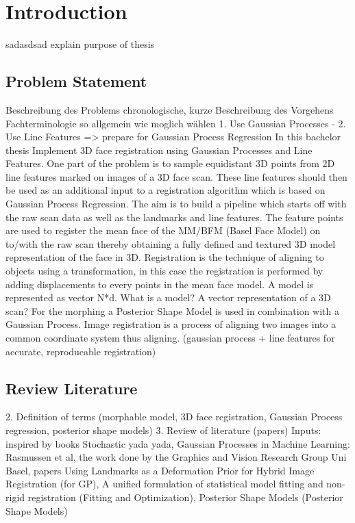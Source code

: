 \chapter{Introduction}
sadasdsad
explain purpose of thesis
\section{Problem Statement}
Beschreibung des Problems
chronologische, kurze Beschreibung des Vorgehens
Fachterminologie so allgemein wie moglich wählen
1. Use Gaussian Processes - 2. Use Line Features => prepare for Gaussian Process Regression
In this bachelor thesis 
Implement 3D face registration using Gaussian Processes and Line Features. One part of the problem is to sample equidistant 3D points from 2D line features marked on images of a 3D face scan. These line features should then be used as an additional input to a registration algorithm which is based on Gaussian Process Regression. The aim is to build a pipeline which starts off with the raw scan data as well as the landmarks and line features. The feature points are used to register the mean face of the MM/BFM (Basel Face Model) on to/with the raw scan thereby obtaining a fully defined and textured 3D model representation of the face in 3D. Registration is the technique of aligning to objects using a transformation, in this case the registration is performed by adding displacements to every points in the mean face model.
A model is represented as vector N*d. What is a model? A vector representation of a 3D scan?
For the morphing a Posterior Shape Model is used in combination with a Gaussian Process.
Image registration is a process of aligning two images into a common coordinate system 
thus aligning.
(gaussian process + line features for accurate, reproducable registration)
\section{Review Literature}
	2. Definition of terms (morphable model, 3D face registration, Gaussian Process regression, posterior shape models)
	3. Review of literature (papers)
    Inputs: inspired by books Stochastic yada yada, Gaussian Processes in Machine Learning: Rasmussen et al, the work done by the Graphics and Vision Research Group Uni Basel, papers 
    Using Landmarks as a Deformation Prior for Hybrid Image Registration (for GP), A unified formulation of statistical model fitting and non-rigid registration (Fitting and Optimization),
Posterior Shape Models (Posterior Shape Models)


